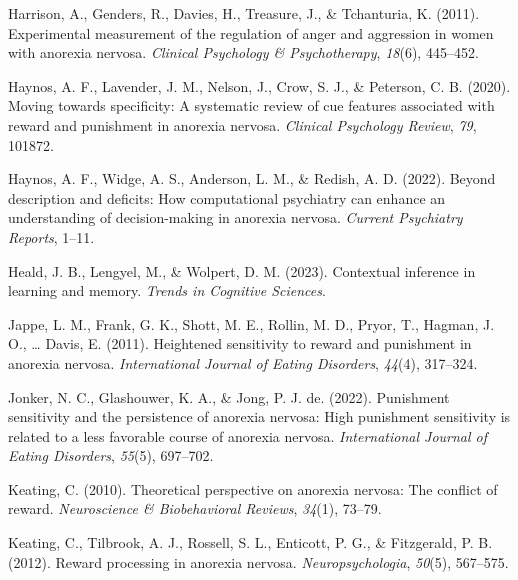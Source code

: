 \documentclass[
  man,floatsintext]{apa6}
\newlength{\cslhangindent}
\newlength{\cslentryspacingunit} %
\newenvironment{CSLReferences}[2] %
 {%
  \setlength{\parindent}{0pt}
  \ifodd #1
  \let\oldpar\par
  \def\par{\hangindent=\cslhangindent\oldpar}
  \fi
  \setlength{\parskip}{#2\cslentryspacingunit}
 }%
 {}
\begin{document}
\begin{CSLReferences}{1}{0}
\leavevmode{}%
Harrison, A., Genders, R., Davies, H., Treasure, J., \& Tchanturia, K. (2011). Experimental measurement of the regulation of anger and aggression in women with anorexia nervosa. \emph{Clinical Psychology \& Psychotherapy}, \emph{18}(6), 445--452.

\leavevmode{}%
Haynos, A. F., Lavender, J. M., Nelson, J., Crow, S. J., \& Peterson, C. B. (2020). Moving towards specificity: A systematic review of cue features associated with reward and punishment in anorexia nervosa. \emph{Clinical Psychology Review}, \emph{79}, 101872.

\leavevmode{}%
Haynos, A. F., Widge, A. S., Anderson, L. M., \& Redish, A. D. (2022). Beyond description and deficits: How computational psychiatry can enhance an understanding of decision-making in anorexia nervosa. \emph{Current Psychiatry Reports}, 1--11.

\leavevmode{}%
Heald, J. B., Lengyel, M., \& Wolpert, D. M. (2023). Contextual inference in learning and memory. \emph{Trends in Cognitive Sciences}.

\leavevmode{}%
Jappe, L. M., Frank, G. K., Shott, M. E., Rollin, M. D., Pryor, T., Hagman, J. O., \ldots{} Davis, E. (2011). Heightened sensitivity to reward and punishment in anorexia nervosa. \emph{International Journal of Eating Disorders}, \emph{44}(4), 317--324.

\leavevmode{}%
Jonker, N. C., Glashouwer, K. A., \& Jong, P. J. de. (2022). Punishment sensitivity and the persistence of anorexia nervosa: High punishment sensitivity is related to a less favorable course of anorexia nervosa. \emph{International Journal of Eating Disorders}, \emph{55}(5), 697--702.

\leavevmode{}%
Keating, C. (2010). Theoretical perspective on anorexia nervosa: The conflict of reward. \emph{Neuroscience \& Biobehavioral Reviews}, \emph{34}(1), 73--79.

\leavevmode{}%
Keating, C., Tilbrook, A. J., Rossell, S. L., Enticott, P. G., \& Fitzgerald, P. B. (2012). Reward processing in anorexia nervosa. \emph{Neuropsychologia}, \emph{50}(5), 567--575.


\end{CSLReferences}
\end{document}
